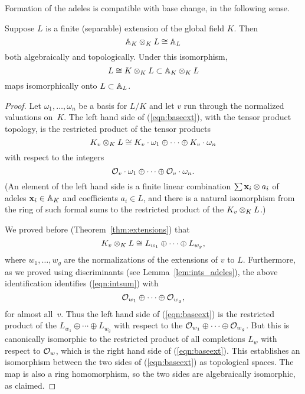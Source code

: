 Formation of the adeles is compatible with base change, in the
following sense.
\begin{lemma}\label{lem:adelext}
  Suppose $L$ is a finite (separable) extension of the global field
  $K$.  Then
\begin{equation}\label{eqn:baseext}
  \AA_K \tensor_K L \isom \AA_L
\end{equation}
both algebraically and topologically.  Under this isomorphism,
  $$L\isom K\tensor_K L \subset \AA_K \tensor_K L$$ maps isomorphically onto
  $L\subset \AA_L$.
\end{lemma}
\begin{proof}
Let $\omega_1,\ldots, \omega_n$
be a basis for $L/K$ and let $v$ run through the normalized valuations
on~$K$.  The left hand side of (\ref{eqn:baseext}), with
the tensor product topology, is the restricted product of the
tensor products
$$
  K_v \tensor_K L \isom K_v \cdot\omega_1 \oplus \cdots \oplus K_v\cdot \omega_n
$$
with respect to the integers
\begin{equation}\label{eqn:intsum}
   \O_v\cdot \omega_1 \oplus \cdots \oplus \O_v\cdot \omega_n.
 \end{equation}
 (An element of the left hand side is a finite linear combination $\sum
\bx_i \tensor a_i$ of adeles $\bx_i \in \AA_K$ and coefficients $a_i
\in L$, and there is a natural isomorphism from the ring of such formal
sums to the restricted product of the $K_v\tensor_K L$.)

We proved before (Theorem~\ref{thm:extensions}) that
 $$
  K_v \tensor_K L \isom L_{w_1} \oplus \cdots \oplus L_{w_g},
  $$
  where $w_1,\ldots, w_g$ are the normalizations of the extensions
  of $v$ to $L$.  Furthermore, as we proved using discriminants (see
  Lemma~\ref{lem:ints_adeles}), the above identification identifies
  (\ref{eqn:intsum}) with
$$
 \O_{w_1} \oplus \cdots \oplus \O_{w_g},
$$
for almost all~$v$.
Thus the left hand side of (\ref{eqn:baseext}) is the restricted
product of the $L_{w_1} \oplus \cdots \oplus L_{w_g}$
with respect to the $\O_{w_1} \oplus \cdots \oplus \O_{w_g}$.
But this is canonically isomorphic to the restricted product
of all completions $L_w$ with respect to $\O_w$, which
is the right hand side of (\ref{eqn:baseext}).  This
establishes an isomorphism between the two sides of (\ref{eqn:baseext})
as topological spaces.  The map is also a ring homomorphism, so
the two sides are algebraically isomorphic, as claimed.
\end{proof}

